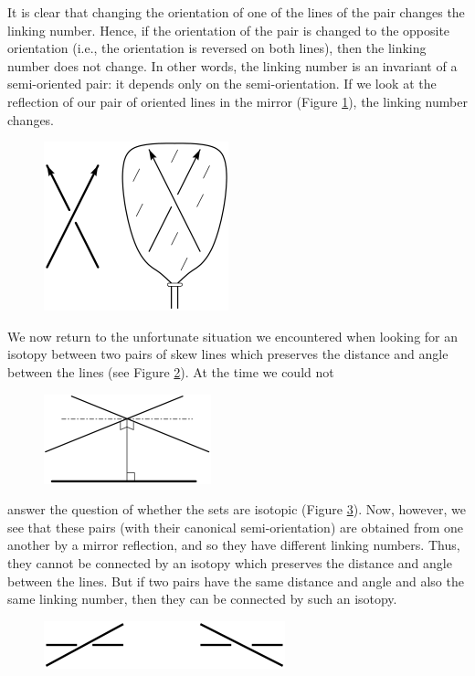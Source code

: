 \documentclass{article}
\begin{document}
It is clear that changing the orientation of one of the lines of the pair
changes the linking number. Hence, if the orientation of the pair is
changed to the opposite orientation (i.e., the orientation is reversed on both
lines), then the linking number does not change. In other words, the
linking number is an invariant of a semi-oriented pair: it depends only on
the semi-orientation. If we look at the reflection of our pair of oriented
lines in the mirror (Figure \ref{f9}), the linking number 
changes. 
\begin{figure}
{\includegraphics{imagesSkewlines/x9.png}}
\caption{}
\label{f9}
\end{figure}

We now return to the unfortunate situation we encountered when looking for an
isotopy between two pairs of skew lines which preserves the distance and angle
between the lines (see Figure \ref{f10}). At the time we could not 
\begin{figure}
{\includegraphics{imagesSkewlines/x10.png}}
\caption{}
\label{f10}
\end{figure}
answer the question
of whether the sets are isotopic (Figure \ref{f11}). Now, however, we 
see that these
pairs (with their canonical semi-orientation) are obtained from one another by
a mirror reflection, and so they have different linking numbers. Thus,
they cannot be connected by an isotopy which preserves the distance and angle
between the lines. But if two pairs have the same distance and angle and also
the same linking number, then they can be connected by such an isotopy.
\begin{figure}
{\includegraphics{imagesSkewlines/x11.png}}
\caption{}
\label{f11}
\end{figure}
\end{document}
